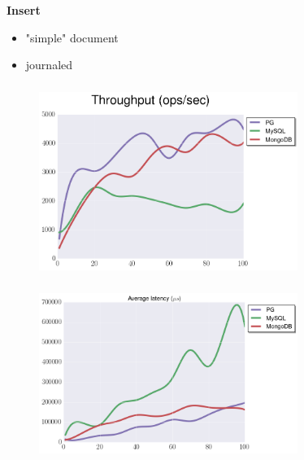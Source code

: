 \documentclass[usenames,dvipsnames, 18pt, compress, aspectratio=169]{beamer}
\begin{document}

\begin{frame}
    \frametitle{}
    \begin{center}
        \textbf{Insert}
        \begin{itemize}[label={}]
            \item "simple" document
            \item journaled
        \end{itemize}
    \end{center}
\end{frame}

\begin{frame}
    \frametitle{}
    \begin{center}
    \begin{figure}
        \includegraphics[width=0.75\textwidth,center]{benchmarks/insert_throughput_journaled.png}
    \end{figure}
    \end{center}
\end{frame}

\begin{frame}
    \frametitle{}
    \begin{center}
    \begin{figure}
        \includegraphics[width=0.75\textwidth,center]{benchmarks/insert_latency_99.png}
    \end{figure}
    \end{center}
\end{frame}
\end{document}
